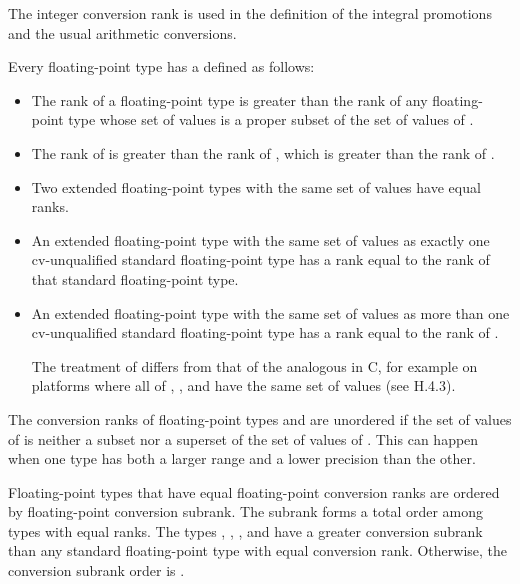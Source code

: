 \begin{note}
The integer conversion rank is used in the definition of the integral
promotions and the usual arithmetic
conversions.
\end{note}

\pnum
Every floating-point type has a 
defined as follows:
\begin{itemize}
\item
The rank of a floating-point type  is greater than
the rank of any floating-point type
whose set of values is a proper subset of the set of values of .
\item
The rank of  is greater than
the rank of ,
which is greater than the rank of .
\item
Two extended floating-point types with the same set of values have equal ranks.
\item
An extended floating-point type with the same set of values as
exactly one cv-unqualified standard floating-point type
has a rank equal to the rank of that standard floating-point type.
\item
An extended floating-point type with the same set of values as
more than one cv-unqualified standard floating-point type
has a rank equal to the rank of .
\begin{tailnote}
The treatment of  differs from
that of the analogous  in C,
for example on platforms where all of
,
, and
have the same set of values (see \IsoC{} H.4.3).
\end{tailnote}
\end{itemize}
\begin{note}
The conversion ranks of floating-point types  and 
are unordered if the set of values of  is
neither a subset nor a superset of the set of values of .
This can happen when one type has both a larger range and a lower precision
than the other.
\end{note}

\pnum
Floating-point types that have equal floating-point conversion ranks
are ordered by floating-point conversion subrank.
The subrank forms a total order among types with equal ranks.
The types
,
,
, and
have a greater conversion subrank than any standard floating-point type
with equal conversion rank.
Otherwise, the conversion subrank order is
.

